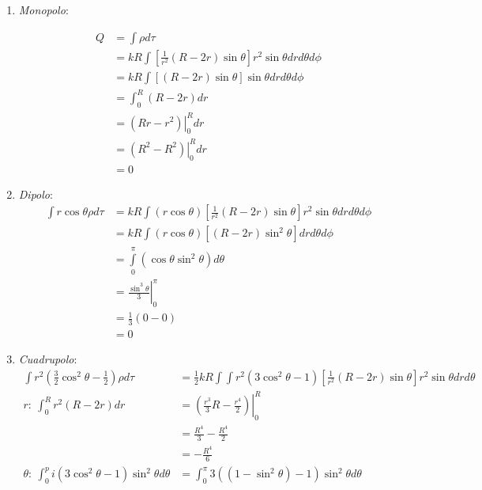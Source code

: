 \documentclass{report}
\begin{document}
\begin{enumerate}
	\item \textit{Monopolo}:

		\begin{align*}
			Q &= \int \rho d\tau\\
			&= kR \int \left[ \frac{1}{r^2} \left( R - 2r \right) \sin\theta \right]r^2 \sin \theta dr d\theta d\phi\\
			&= kR \int \left[ \left( R - 2r \right) \sin\theta \right] \sin \theta dr d\theta d\phi\\
			&= \int_0^R \left( R - 2r \right) dr\\
			&= \left.\left( Rr - r^2 \right)\right|_{0}^{R} dr\\
			&= \left.\left( R^2 - R^2 \right)\right|_{0}^{R} dr\\
			&= 0
		\end{align*}
	\item \textit{Dipolo}:
		\begin{align*}
			\int r \cos \theta \rho d\tau &= kR \int \left( r \cos\theta \right) \left[ \frac{1}{r^2} \left( R - 2r \right) \sin\theta \right]r^2 \sin \theta dr d\theta d\phi\\
			&= kR \int \left( r \cos\theta \right) \left[ \left( R - 2r \right) \sin^2\theta \right]dr d\theta d\phi\\
			&= \int\limits^{\pi}_{0} \left( \cos\theta\sin^2\theta \right) d\theta\\
			&= \left. \frac{\sin^3\theta}{3}\right|_{0}^{\pi}\\
			&= \frac{1}{3}\left( 0 - 0 \right)\\
			&= 0
		\end{align*}
	\item \textit{Cuadrupolo}:
		\begin{align*}
			\int r^2 \left( \frac{3}{2}\cos^2\theta - \frac{1}{2} \right)\rho d\tau &= \frac{1}{2}kR \int\int r^2 \left( 3 \cos^2\theta - 1 \right)\left[ \frac{1}{r^2} \left( R - 2r \right)\sin\theta \right] r^2 \sin\theta drd\theta\\
			r:\ \int_0^R r^2 \left( R - 2r \right)dr &= \left. \left( \frac{r^3}{3}R - \frac{r^4}{2} \right)\right|_0^R\\
			&= \frac{R^4}{3} - \frac{R^4}{2}\\
			&= - \frac{R^4}{6}\\
			\theta:\ \int_0^pi \left( 3\cos^2\theta - 1 \right) \sin^2\theta d\theta &= \int_0^\pi 3 \left(  \left( 1 - \sin^2\theta \right) - 1\right) \sin^2\theta d\theta\\

\end{align*}
\end{enumerate}
\end{document}
